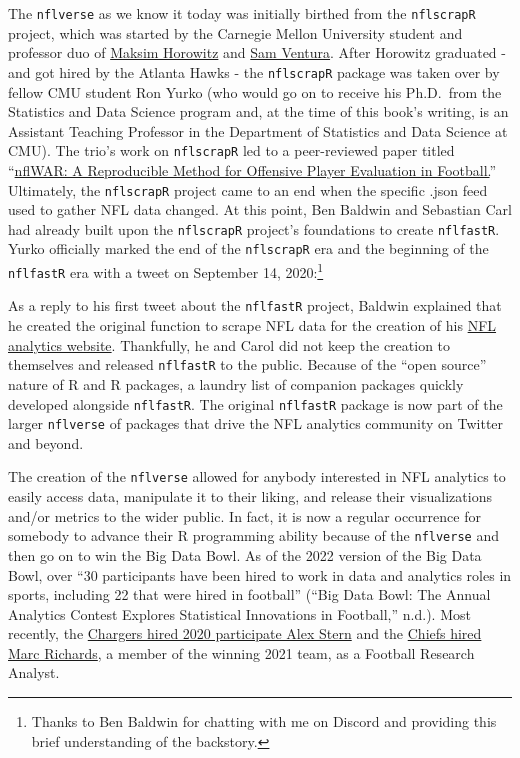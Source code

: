 \documentclass[
  letterpaper,
]{krantz}
\begin{document}
The \texttt{nflverse} as we know it today was initially birthed from the
\texttt{nflscrapR} project, which was started by the Carnegie Mellon
University student and professor duo of
\href{https://twitter.com/bklynmaks?lang=en}{Maksim Horowitz} and
\href{https://twitter.com/stat_sam}{Sam Ventura}. After Horowitz
graduated - and got hired by the Atlanta Hawks - the \texttt{nflscrapR}
package was taken over by fellow CMU student Ron Yurko (who would go on
to receive his Ph.D.~from the Statistics and Data Science program and,
at the time of this book's writing, is an Assistant Teaching Professor
in the Department of Statistics and Data Science at CMU). The trio's
work on \texttt{nflscrapR} led to a peer-reviewed paper titled
``\href{https://arxiv.org/pdf/1802.00998.pdf}{nflWAR: A Reproducible
Method for Offensive Player Evaluation in Football.}'' Ultimately, the
\texttt{nflscrapR} project came to an end when the specific .json feed
used to gather NFL data changed. At this point, Ben Baldwin and
Sebastian Carl had already built upon the \texttt{nflscrapR} project's
foundations to create \texttt{nflfastR}. Yurko officially marked the end
of the \texttt{nflscrapR} era and the beginning of the \texttt{nflfastR}
era with a tweet on September 14, 2020:\footnote{Thanks to Ben Baldwin
  for chatting with me on Discord and providing this brief understanding
  of the backstory.}

As a reply to his first tweet about the \texttt{nflfastR} project,
Baldwin explained that he created the original function to scrape NFL
data for the creation of his \href{https://rbsdm.com/stats/stats/}{NFL
analytics website}. Thankfully, he and Carol did not keep the creation
to themselves and released \texttt{nflfastR} to the public. Because of
the ``open source'' nature of R and R packages, a laundry list of
companion packages quickly developed alongside \texttt{nflfastR}. The
original \texttt{nflfastR} package is now part of the larger
\texttt{nflverse} of packages that drive the NFL analytics community on
Twitter and beyond.

The creation of the \texttt{nflverse} allowed for anybody interested in
NFL analytics to easily access data, manipulate it to their liking, and
release their visualizations and/or metrics to the wider public. In
fact, it is now a regular occurrence for somebody to advance their R
programming ability because of the \texttt{nflverse} and then go on to
win the Big Data Bowl. As of the 2022 version of the Big Data Bowl, over
``30 participants have been hired to work in data and analytics roles in
sports, including 22 that were hired in football'' ({``Big Data Bowl:
The Annual Analytics Contest Explores Statistical Innovations in
Football,''} n.d.). Most recently, the
\href{https://www.boltsfromtheblue.com/2021/7/9/22570490/chargers-news-nfl-big-data-bowl}{Chargers
hired 2020 participate Alex Stern} and the
\href{https://twitter.com/sethwalder/status/1532721476209627136}{Chiefs
hired Marc Richards}, a member of the winning 2021 team, as a Football
Research Analyst.
\end{document}
